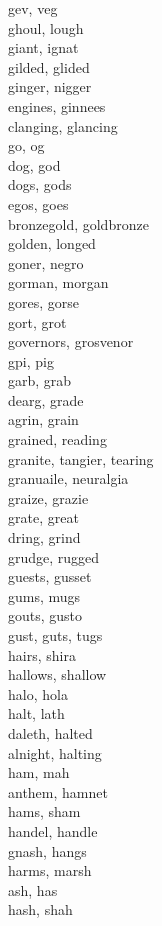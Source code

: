 gev, veg\\
ghoul, lough\\
giant, ignat\\
gilded, glided\\
ginger, nigger\\
engines, ginnees\\
clanging, glancing\\
go, og\\
dog, god\\
dogs, gods\\
egos, goes\\
bronzegold, goldbronze\\
golden, longed\\
goner, negro\\
gorman, morgan\\
gores, gorse\\
gort, grot\\
governors, grosvenor\\
gpi, pig\\
garb, grab\\
dearg, grade\\
agrin, grain\\
grained, reading\\
granite, tangier, tearing\\
granuaile, neuralgia\\
graize, grazie\\
grate, great\\
dring, grind\\
grudge, rugged\\
guests, gusset\\
gums, mugs\\
gouts, gusto\\
gust, guts, tugs\\
hairs, shira\\
hallows, shallow\\
halo, hola\\
halt, lath\\
daleth, halted\\
alnight, halting\\
ham, mah\\
anthem, hamnet\\
hams, sham\\
handel, handle\\
gnash, hangs\\
harms, marsh\\
ash, has\\
hash, shah\\
